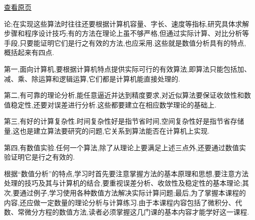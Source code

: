 \documentclass[
  10pt,
  fontset=fandol]{ctexart}
\begin{document}
\href{../../source-images/pdf-015.jpeg}{查看原页}

论;在实现这些算法时往往还要根据计算机容量、字长、速度等指标,研究具体求解步骤和程序设计技巧;有的方法在理论上虽不够严格,但通过实际计算、对比分析等手段,只要能证明它们是行之有效的方法,也应采用.这些就是数值分析具有的特点,概括起来有四点.

第一,面向计算机,要根据计算机特点提供实际可行的有效算法,即算法只能包括加、减、乘、除运算和逻辑运算,它们都是计算机能直接处理的.

第二,有可靠的理论分析,能任意逼近并达到精度要求,对近似算法要保证收敛性和数值稳定性,还要对误差进行分析.这些都要建立在相应数学理论的基础上.

第三,有好的计算复杂性.时间复杂性好是指节省时间,空间复杂性好是指节省存储量,这也是建立算法要研究的问题,它关系到算法能否在计算机上实现.

第四,有数值实验.任何一个算法,除了从理论上要满足上述三点外,还要通过数值实验证明它是行之有效的.

根据``数值分析''的特点,学习时首先要注意掌握方法的基本原理和思想,要注意方法处理的技巧及其与计算机的结合,要重视误差分析、收敛性及稳定性的基本理论;其次,要通过例子,学习使用各种数值方法解决实际计算问题;最后,为了掌握本课程的内容,还应做一定数量的理论分析与计算练习.由于本课程内容包括了微积分、代数、常微分方程的数值方法,读者必须掌握这几门课的基本内容才能学好这一课程.
\end{document}
